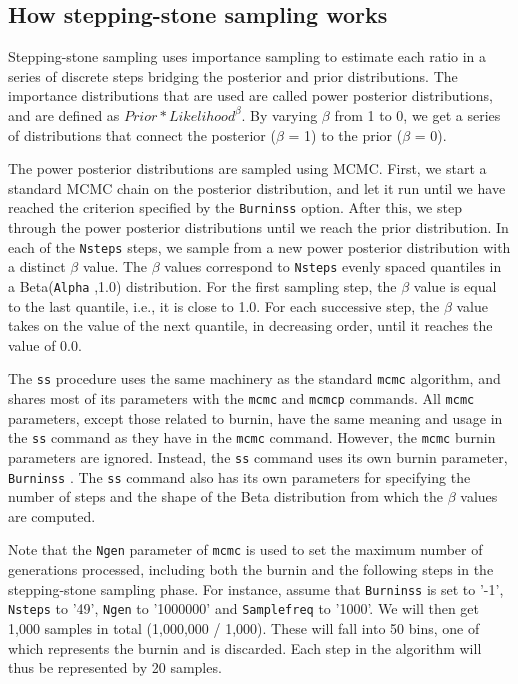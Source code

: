 \documentclass[12pt]{book}
\newcommand{\ttt}[1]{\texttt{#1} }
\begin{document}
\subsection{How stepping-stone sampling works}

Stepping-stone sampling uses importance sampling to estimate each ratio in a
   series of discrete steps bridging the posterior and prior distributions.
   The importance distributions that are used are called power posterior distributions, and are defined as
   $Prior*Likelihood^{\beta}$. By varying $\beta$ from 1 to
   0, we get a series of distributions that connect the posterior ($\beta$ = 1) to
   the prior ($\beta$ = 0).

   The power posterior distributions are sampled using MCMC. First, we start a
   standard MCMC chain on the posterior distribution, and let it run until we
   have reached the criterion specified by the \ttt{Burninss} option. After this, we
   step through the power posterior distributions until we reach the prior distribution. 
   In each of the \ttt{Nsteps} steps, we sample from a new power posterior distribution with
   a distinct $\beta$ value. The $\beta$ values correspond to
   \ttt{Nsteps} evenly spaced quantiles in a Beta(\ttt{Alpha},1.0) distribution. 
   For the first sampling step, the $\beta$ value is equal to the
   last quantile, i.e., it is close to 1.0. For each successive step, the $\beta$
   value takes on the value of the next quantile, in decreasing order, until it
   reaches the value of 0.0.


   The \ttt{ss} procedure uses the same machinery as the standard \ttt{mcmc} algorithm,
   and shares most of its parameters with the \ttt{mcmc} and \ttt{mcmcp} commands. All
   \ttt{mcmc} parameters, except those related to burnin, have the same meaning and
   usage in the \ttt{ss} command as they have in the \ttt{mcmc} command. However, the
   \ttt{mcmc} burnin parameters are ignored. Instead, the \ttt{ss} command uses its own
   burnin parameter, \ttt{Burninss}. The \ttt{ss} command also has
   its own parameters for specifying the number of steps and the shape of the
   Beta distribution from which the $\beta$ values are computed.

   Note that the \ttt{Ngen} parameter of \ttt{mcmc} is used to set the maximum number of
   generations processed, including both the burnin and the following steps in
   the stepping-stone sampling phase. For instance, assume that \ttt{Burninss} is set
   to '-1', \ttt{Nsteps} to '49', \ttt{Ngen} to '1000000' and \ttt{Samplefreq} to '1000'.
   We will then get 1,000 samples in total (1,000,000 / 1,000). These will fall
   into 50 bins, one of which represents the burnin and is discarded. Each step
   in the algorithm will thus be represented by 20 samples.
\end{document}
